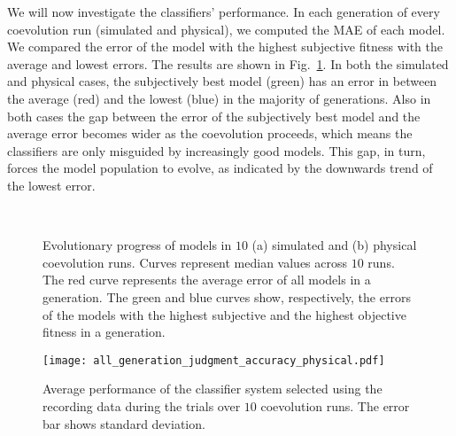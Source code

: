 We will now investigate the classifiers' performance. In each generation 
of every coevolution run (simulated and physical), we computed the MAE of each model. We compared the error of the model with the highest subjective fitness with the average and lowest errors. The results are shown in Fig.~\ref{fig:MAE_compare_simulation_physical}.
In both the simulated and physical cases, the subjectively best model (green) has an error in between the average (red) and the lowest (blue) in the majority of generations. Also in both cases the gap between the error of the subjectively best model and the average error becomes wider as the coevolution proceeds, which means the classifiers are only misguided by increasingly good models. This gap, in turn, forces the model population to evolve, as indicated by the downwards trend of the lowest error.
%
%
\begin{figure}[!t]%
	\centering
		\\
		\caption{Evolutionary progress of models in $10$ (a) simulated and (b) physical coevolution runs. Curves represent median values across $10$ runs. The red curve represents the average error of all models in a generation. The green and blue curves show, respectively, the errors of the models with the highest subjective and the highest objective fitness in a generation.}
		\label{fig:MAE_compare_simulation_physical}
\end{figure}
%
\begin{figure}[!t]
    \centering
    \texttt{[image: all\_generation\_judgment\_accuracy\_physical.pdf]}
    \caption{Average performance of the classifier system selected using the recording data during the trials over $10$ coevolution runs. The error bar shows standard deviation.}
    \label{fig:all_generation_judgment_accuracy_physical}
\end{figure}

